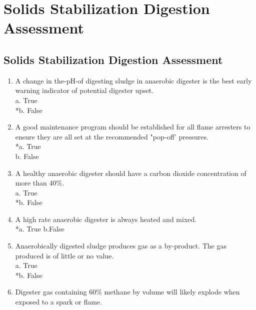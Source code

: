 
\chapter{Solids Stabilization Digestion Assessment}

\section*{Solids Stabilization Digestion Assessment}

\begin{enumerate}

\item  A change in the-pH-of digesting sludge in anaerobic digester is the best early warning indicator of potential digester upset. \\

a. True \\
*b. False \\

\item  A good maintenance program should be established for all flame arresters to ensure they are all set at the recommended "pop-off' pressures. \\

*a. True \\
b. False \\

\item  A healthy anaerobic digester should have a carbon dioxide concentration of more than 40\%. \\

a. True \\
*b. False \\

\item  A high rate anaerobic digester is always heated and mixed. \\

*a. True
b.False \\

\item  Anaerobically digested sludge produces gas as a by-product. The gas produced is of little or no value. \\

a. True \\
*b. False \\

\item  Digester gas containing 60\% methane by volume will likely explode when exposed to a spark or flame. \\


\end{enumerate}
